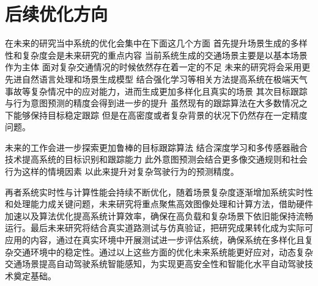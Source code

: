 \section{后续优化方向}

在未来的研究当中系统的优化会集中在下面这几个方面 首先提升场景生成的多样性和复杂度会是未来研究的重点内容 当前系统生成的交通场景主要是以基本场景作为主体 面对复杂交通情况的时候依然存在着一定的不足 未来的研究将会采用更先进自然语言处理和场景生成模型 结合强化学习等相关方法提高系统在极端天气事故等复杂情况中的应对能力，进而生成更加多样化且真实的场景 其次目标跟踪与行为意图预测的精度会得到进一步的提升 虽然现有的跟踪算法在大多数情况之下能够保持目标稳定跟踪 但是在高密度或者复杂背景的状况下仍然存在一定精度问题。

未来的工作会进一步探索更加鲁棒的目标跟踪算法 结合深度学习和多传感器融合技术提高系统的目标识别和跟踪能力 此外意图预测会结合更多像交通规则和社会行为这样的情境因素 以此来提升对复杂驾驶行为的预测精度。


再者系统实时性与计算性能会持续不断优化，随着场景复杂度逐渐增加系统实时性和处理能力成关键问题，未来研究将重点聚焦高效图像处理和计算方法，借助硬件加速以及算法优化提高系统计算效率，确保在高负载和复杂场景下依旧能保持流畅运行。最后未来研究将结合真实道路测试与仿真验证，把研究成果转化成为实际可应用的内容，通过在真实环境中开展测试进一步评估系统，确保系统在多样化且复杂交通环境中的稳定性。通过以上这些方面的优化未来系统能更好应对，动态复杂交通场景提高自动驾驶系统智能感知，为实现更高安全性和智能化水平自动驾驶技术奠定基础。
